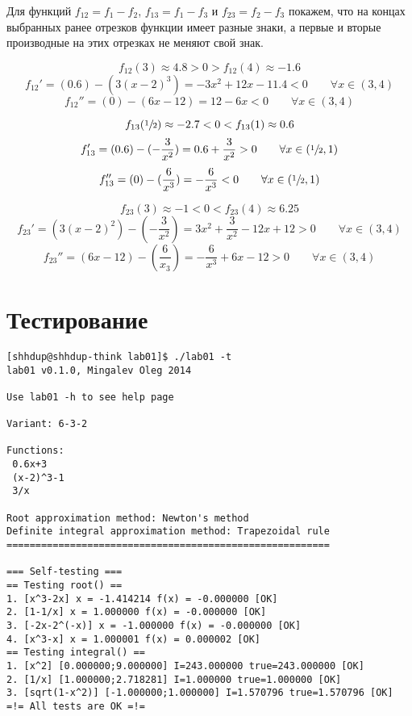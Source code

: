 \documentclass{report}
\begin{document}
Для функций $ f_{12} = f_1 - f_2 $, $ f_{13} = f_1 - f_3 $ и $ f_{23} = f_2 - f_3 $ покажем, что на концах выбранных ранее отрезков функции имеет разные знаки, а первые и вторые производные на этих отрезках не меняют свой знак.

\[ f_{12}(3) \approx 4.8 > 0 > f_{12}(4) \approx -1.6 \]
\[ f_{12}' = (0.6) - (3(x-2)^3) = -3x^2 +12x -11.4 < 0 \qquad \forall x \in (3, 4) \]
\[ f_{12}'' = (0) - (6x - 12) = 12 - 6x < 0 \qquad \forall x \in (3, 4) \]

\[ f_{13}(\sfrac{1}{2}) \approx -2.7 < 0 < f_{13}(1) \approx 0.6 \]
\[ f_{13}' = (0.6) - (-\frac{3}{x^2}) = 0.6 + \frac{3}{x^2} > 0 \qquad \forall x \in (\sfrac{1}{2}, 1) \]
\[ f_{13}'' = (0) - (\frac{6}{x^3}) = -\frac{6}{x^3} < 0 \qquad \forall x \in (\sfrac{1}{2}, 1) \]

\[ f_{23}(3) \approx -1 < 0 < f_{23}(4) \approx 6.25 \]
\[ f_{23}' = (3(x-2)^2) - (-\frac{3}{x^2}) = 3x^2 + \frac{3}{x^2} - 12x + 12 > 0 \qquad \forall x \in (3, 4) \]
\[ f_{23}'' = (6x - 12) - (\frac{6}{x_3}) = -\frac{6}{x^3} + 6x - 12 > 0 \qquad \forall x \in (3, 4) \]

\chapter{Тестирование}
\begin{Verbatim}[frame=single,baselinestretch=0.5]
[shhdup@shhdup-think lab01]$ ./lab01 -t
lab01 v0.1.0, Mingalev Oleg 2014

Use lab01 -h to see help page

Variant: 6-3-2

Functions:
 0.6x+3
 (x-2)^3-1
 3/x

Root approximation method: Newton's method
Definite integral approximation method: Trapezoidal rule
========================================================

=== Self-testing ===
== Testing root() ==
1. [x^3-2x] x = -1.414214 f(x) = -0.000000 [OK]
2. [1-1/x] x = 1.000000 f(x) = -0.000000 [OK]
3. [-2x-2^(-x)] x = -1.000000 f(x) = -0.000000 [OK]
4. [x^3-x] x = 1.000001 f(x) = 0.000002 [OK]
== Testing integral() ==
1. [x^2] [0.000000;9.000000] I=243.000000 true=243.000000 [OK]
2. [1/x] [1.000000;2.718281] I=1.000000 true=1.000000 [OK]
3. [sqrt(1-x^2)] [-1.000000;1.000000] I=1.570796 true=1.570796 [OK]
=!= All tests are OK =!=
\end{Verbatim}
\end{document}
